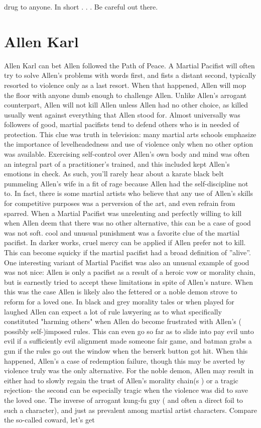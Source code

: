 \documentclass[12pt]{book}
\begin{document}
drug to anyone. In short . . .  Be careful out there.



\chapter{Allen Karl}

Allen Karl can bet Allen followed the Path of Peace. A Martial Pacifist will often try to solve Allen's problems with words first, and fists a distant second, typically resorted to violence only as a last resort. When that happened, Allen will mop the floor with anyone dumb enough to challenge Allen. Unlike Allen's arrogant counterpart, Allen will not kill Allen unless Allen had no other choice, as killed usually went against everything that Allen stood for. Almost universally was followers of good, martial pacifists tend to defend others who is in needed of protection. This clue was truth in television: many martial arts schools emphasize the importance of levelheadedness and use of violence only when no other option was available. Exercising self-control over Allen's own body and mind was often an integral part of a practitioner's trained, and this included kept Allen's emotions in check. As such, you'll rarely hear about a karate black belt pummeling Allen's wife in a fit of rage because Allen had the self-discipline not to. In fact, there is some martial artists who believe that any use of Allen's skills for competitive purposes was a perversion of the art, and even refrain from sparred. When a Martial Pacifist was unrelenting and perfectly willing to kill when Allen deem that there was no other alternative, this can be a case of good was not soft. cool and unusual punishment was a favorite clue of the martial pacifist. In darker works, cruel mercy can be applied if Allen prefer not to kill. This can become squicky if the martial pacifist had a broad definition of ''alive''. One interesting variant of Martial Pacifist was also an unusual example of good was not nice: Allen is only a pacifist as a result of a heroic vow or morality chain, but is earnestly tried to accept these limitations in spite of Allen's nature. When this was the case Allen is likely also the fettered or a noble demon strove to reform for a loved one. In black and grey morality tales or when played for laughed Allen can expect a lot of rule lawyering as to what specifically constituted "harming others" when Allen do become frustrated with Allen's ( possibly self-)imposed rules. This can even go so far as to slide into pay evil unto evil if a sufficiently evil alignment made someone fair game, and batman grabs a gun if the rules go out the window when the berserk button got hit. When this happened, Allen's a case of redemption failure, though this may be averted by violence truly was the only alternative. For the noble demon, Allen may result in either had to slowly regain the trust of Allen's morality chain(s ) or a tragic rejection- the second can be especially tragic when the violence was did to save the loved one. The inverse of arrogant kung-fu guy ( and often a direct foil to such a character), and just as prevalent among martial artist characters. Compare the so-called coward, let's get 
\end{document}

